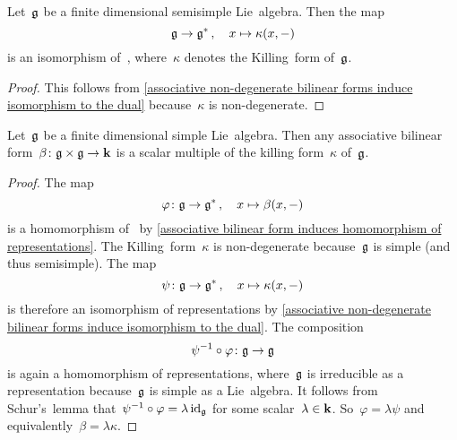 \begin{lemma}
  \label{semisimple lie algebra identification with dual space}
  Let~$\glie$ be a finite dimensional semisimple Lie~algebra.
  Then the map
  \[
    \mathfrak{g}
    \to
    \mathfrak{g}^* \,,
    \quad
    x
    \mapsto
    \kappa(x,-)
  \]
  is an isomorphism of~{\representations{$\glie$}}, where~$\kappa$ denotes the Killing~form of~$\glie$.
\end{lemma}


\begin{proof}
  This follows from \cref{associative non-degenerate bilinear forms induce isomorphism to the dual} because~$\kappa$ is non-degenerate.
\end{proof}


\begin{corollary}
  \label{uniqueness of invariant bilinear forms for simple}
  Let~$\glie$ be a finite dimensional simple Lie~algebra.
  Then any associative bilinear form~$\beta \colon \mathfrak{g} \times \mathfrak{g} \to \mathbf{k}$ is a scalar multiple of the killing form~$\kappa$ of~$\glie$.
\end{corollary}


\begin{proof}
 The map
 \[
  \varphi
  \colon
  \mathfrak{g}
  \to
  \mathfrak{g}^* \,,
  \quad
  x
  \mapsto
  \beta(x, -)
 \]
 is a homomorphism of~{\representations{$\glie$}} by \cref{associative bilinear form induces homomorphism of representations}.
 The Killing~form~$\kappa$ is non-degenerate because~$\glie$ is simple (and thus semisimple).
 The map
 \[
  \psi
  \colon
  \mathfrak{g}
  \to
  \mathfrak{g}^* \,,
  \quad
  x
  \mapsto
  \kappa(x, -)
 \]
 is therefore an isomorphism of representations by \cref{associative non-degenerate bilinear forms induce isomorphism to the dual}.
 The composition
 \[
  \psi^{-1}
  \circ
  \varphi
  \colon
  \mathfrak{g}
  \to
  \mathfrak{g} 
 \]
 is again a homomorphism of representations, where~$\glie$ is irreducible as a representation because~$\glie$ is simple as a Lie~algebra.
 It follows from Schur’s~lemma that~$\psi^{-1} \circ \varphi = \lambda \operatorname{id}_{\mathfrak{g}}$ for some scalar~$\lambda \in \mathbf{k}$.
 So~$\varphi = \lambda \psi$ and equivalently~$\beta = \lambda \kappa$.
\end{proof}




